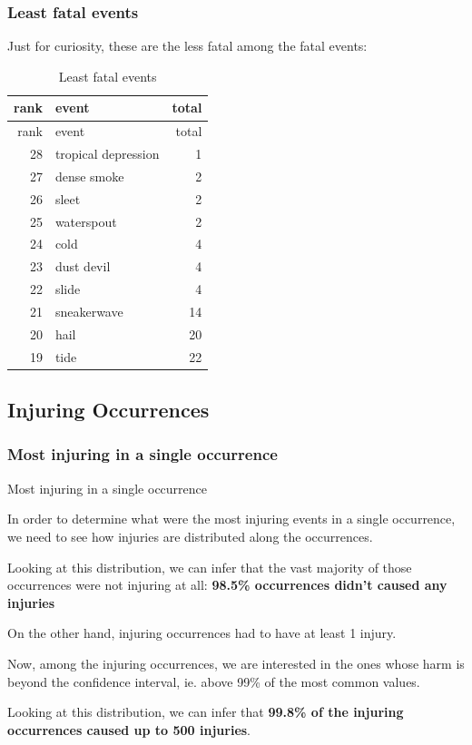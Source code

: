 \documentclass[]{article}
\begin{document}
\subsubsection{Least fatal events}\label{least-fatal-events}

Just for curiosity, these are the less fatal among the fatal events:

\begin{longtable}[]{@{}rlr@{}}
\caption{Least fatal events}\tabularnewline
\toprule
rank & event & total\tabularnewline
\midrule
\endfirsthead
\toprule
rank & event & total\tabularnewline
\midrule
\endhead
28 & tropical depression & 1\tabularnewline
27 & dense smoke & 2\tabularnewline
26 & sleet & 2\tabularnewline
25 & waterspout & 2\tabularnewline
24 & cold & 4\tabularnewline
23 & dust devil & 4\tabularnewline
22 & slide & 4\tabularnewline
21 & sneakerwave & 14\tabularnewline
20 & hail & 20\tabularnewline
19 & tide & 22\tabularnewline
\bottomrule
\end{longtable}

\subsection{Injuring Occurrences}\label{injuring-occurrences}

\subsubsection{Most injuring in a single
occurrence}\label{most-injuring-in-a-single-occurrence}

Most injuring in a single occurrence

In order to determine what were the most injuring events in a single
occurrence, we need to see how injuries are distributed along the
occurrences.

Looking at this distribution, we can infer that the vast majority of
those occurrences were not injuring at all: \textbf{98.5\% occurrences
didn't caused any injuries}

On the other hand, injuring occurrences had to have at least 1 injury.

Now, among the injuring occurrences, we are interested in the ones whose
harm is beyond the confidence interval, ie. above 99\% of the most
common values.

Looking at this distribution, we can infer that \textbf{99.8\% of the
injuring occurrences caused up to 500 injuries}.
\end{document}
